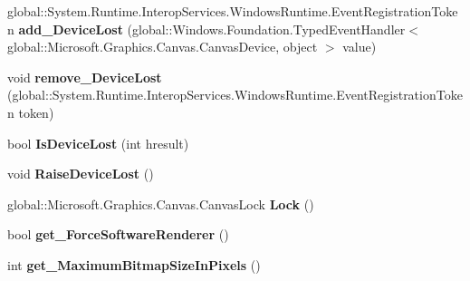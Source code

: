 \begin{DoxyCompactItemize}
global\+::\+System.\+Runtime.\+Interop\+Services.\+Windows\+Runtime.\+Event\+Registration\+Token {\bfseries add\+\_\+\+Device\+Lost} (global\+::\+Windows.\+Foundation.\+Typed\+Event\+Handler$<$ global\+::\+Microsoft.\+Graphics.\+Canvas.\+Canvas\+Device, object $>$ value)
\item 
\mbox{\label{interface_microsoft_1_1_graphics_1_1_canvas_1_1_i_canvas_device_a4423eb62fed2e41b1e8429993ad3b1f1}} 
void {\bfseries remove\+\_\+\+Device\+Lost} (global\+::\+System.\+Runtime.\+Interop\+Services.\+Windows\+Runtime.\+Event\+Registration\+Token token)
\item 
\mbox{\label{interface_microsoft_1_1_graphics_1_1_canvas_1_1_i_canvas_device_adb664badebd02d30b2beead4a270a634}} 
bool {\bfseries Is\+Device\+Lost} (int hresult)
\item 
\mbox{\label{interface_microsoft_1_1_graphics_1_1_canvas_1_1_i_canvas_device_a6b74db4223ca531731fcff1891a390d8}} 
void {\bfseries Raise\+Device\+Lost} ()
\item 
\mbox{\label{interface_microsoft_1_1_graphics_1_1_canvas_1_1_i_canvas_device_ac7789f0058908fdfff7cf83b25227a23}} 
global\+::\+Microsoft.\+Graphics.\+Canvas.\+Canvas\+Lock {\bfseries Lock} ()
\item 
\mbox{\label{interface_microsoft_1_1_graphics_1_1_canvas_1_1_i_canvas_device_a71ebd55a219b2267a83a68fa3caf42a0}} 
bool {\bfseries get\+\_\+\+Force\+Software\+Renderer} ()
\item 
\mbox{\label{interface_microsoft_1_1_graphics_1_1_canvas_1_1_i_canvas_device_a898fb605ef7e1454030d832f6091f198}} 
int {\bfseries get\+\_\+\+Maximum\+Bitmap\+Size\+In\+Pixels} ()
\item 
\mbox{\label{interface_microsoft_1_1_graphics_1_1_canvas_1_1_i_canvas_device_a1bbc8a4c7b32d66babc6a466f3947580}} 

\end{DoxyCompactItemize}
